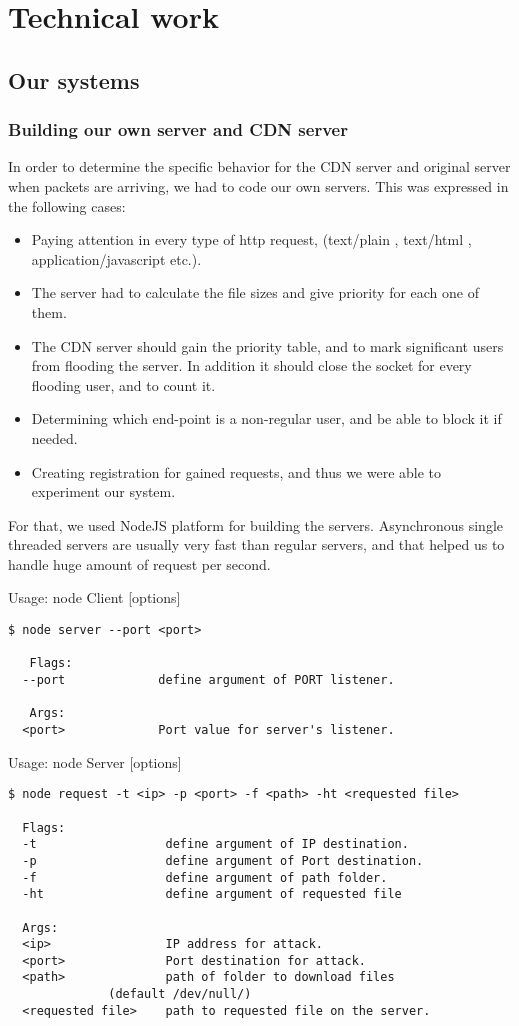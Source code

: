 \documentclass{report}
\begin{document}
\chapter {Technical work}
\section {Our systems}
\subsection {Building our own server and CDN server}
In order to determine the specific behavior for the \gls{CDN} server and original server when packets are arriving, we had to code our own servers. This was expressed in the following cases:
\begin{itemize}
\item Paying attention in every type of http request, (text/plain , text/html , application/javascript etc.).
\item The server had to calculate the file sizes and give priority for each one of them.
\item The \gls{CDN} server should gain the priority table, and to mark significant users from flooding the server. In addition it should close the socket for every flooding user, and to count it.
\item Determining which end-point is a non-regular user, and be able to block it if needed.
\item Creating registration for gained requests, and thus we were able to experiment our system.

\end{itemize}
For that, we used NodeJS platform for building the servers. Asynchronous single threaded servers are usually very fast than regular servers, and that helped us to handle huge amount of request per second.

Usage: node Client [options]

\begin{lstlisting}[frame=single]
$ node server --port <port>

   Flags:
  --port             define argument of PORT listener.

   Args:
  <port>             Port value for server's listener.
\end{lstlisting}

Usage: node Server [options]

\begin{lstlisting}[frame=single]
$ node request -t <ip> -p <port> -f <path> -ht <requested file>

  Flags:
  -t                  define argument of IP destination.
  -p                  define argument of Port destination.
  -f                  define argument of path folder.
  -ht                 define argument of requested file

  Args:
  <ip>                IP address for attack.
  <port>              Port destination for attack.
  <path>              path of folder to download files
		      (default /dev/null/)
  <requested file>    path to requested file on the server.
\end{lstlisting}
\end{document}
